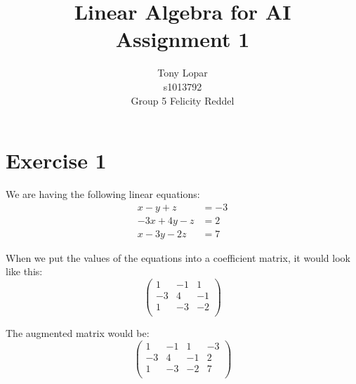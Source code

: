 \documentclass[a4paper]{article}
\title{Linear Algebra for AI\\Assignment 1}
\author{Tony Lopar \\ s1013792 \\ Group 5 \quad Felicity Reddel}
\begin{document}
\maketitle

\section*{Exercise 1}
We are having the following linear equations: \\
\begin{align*}
x - y + z &= -3 \\
-3x + 4y - z &= 2 \\
x - 3y - 2z &= 7
\end{align*}

When we put the values of the equations into a coefficient matrix, it would look like this: \\
\[
\left(
\begin{array}{ccc}
1 & -1 & 1   \\
-3 & 4 & -1 \\
1 & -3 & -2    \\
\end{array}
\right)
\]

The augmented matrix would be:
\[
\left(
\begin{array}{ccc|c}
1 & -1 & 1 & -3   \\
-3 & 4 & -1 & 2  \\
1 & -3 & -2 & 7   \\
\end{array}
\right)
\]
\end{document}
